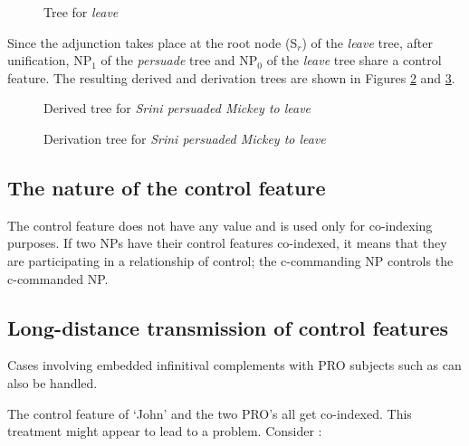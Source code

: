 \begin{figure}[hbt]
\centering
\hspace{0.0in}
\caption{Tree for {\it leave}}
\label{leave-tree}
\end{figure}

Since the adjunction takes place at the root node (S$_{r}$) of the {\em
leave} tree, after unification, NP$_{1}$ of the {\em persuade} tree and
NP$_{0}$ of the {\em leave} tree share a control feature. The resulting
derived and derivation trees are shown in Figures
\ref{derived-tree-persuaded} and \ref{derivation-tree-persuaded}.

\begin{figure}[hbt]
\centering
\hspace{0.0in}
\caption{Derived tree for {\it Srini persuaded Mickey to leave}}
\label{derived-tree-persuaded}
\end{figure}

\begin{figure}[hbt]
\centering
\hspace{0.0in}
\caption{Derivation tree for {\it Srini persuaded Mickey to leave}}
\label{derivation-tree-persuaded}
\end{figure}


\subsection{The nature of the control feature}
The control feature does not have any value and is used only for
co-indexing purposes. If two NPs have their control features
co-indexed, it means that they are participating in a relationship
of control; the c-commanding NP controls the c-commanded NP. 

\subsection{Long-distance transmission of control features}
Cases involving embedded infinitival complements with PRO subjects such as
 can also be handled.


The control feature of `John' and the two PRO's all get co-indexed.
This treatment might appear to lead to a problem. Consider :

